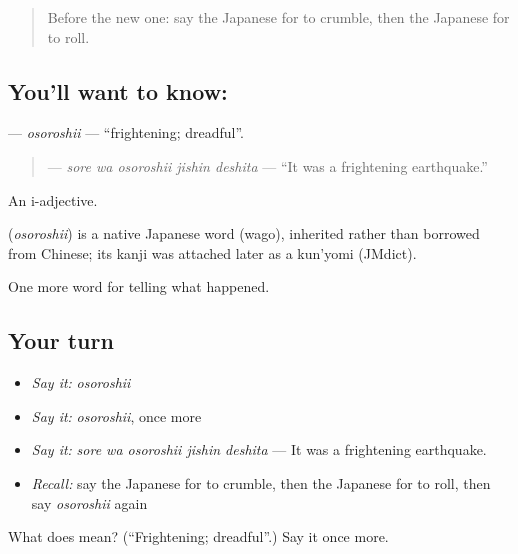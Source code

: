 \begin{quote}
Before the new one: say the Japanese for to crumble, then the Japanese for to roll.
\end{quote}

\subsection*{You'll want to know: }
\textbf{} — \emph{osoroshii} — \textquotedblleft{}frightening; dreadful\textquotedblright{}.

\begin{quote}
\textbf{  } — \emph{sore wa osoroshii jishin deshita} — \textquotedblleft{}It was a frightening earthquake.\textquotedblright{}
\end{quote}

An i-adjective.

\begin{cousinweb}
\textbf{} (\emph{osoroshii}) is a native Japanese word (wago), inherited rather than borrowed from Chinese; its kanji was attached later as a kun'yomi (JMdict).
\end{cousinweb}

\begin{grammarlens}[title={What you've built}]
One more word for telling what happened.
\end{grammarlens}

\subsection*{Your turn}
\begin{itemize}
\raggedright
  \item \emph{Say it:} \emph{osoroshii}
  \item \emph{Say it:} \emph{osoroshii}, once more
  \item \emph{Say it:} \emph{sore wa osoroshii jishin deshita} — It was a frightening earthquake.
  \item \emph{Recall:} say the Japanese for to crumble, then the Japanese for to roll, then say \emph{osoroshii} again
\end{itemize}

\begin{tcolorbox}[breakable,colback=teal!4,colframe=teal!35!black,title={Before you move on}]
What does  mean? (\textquotedblleft{}Frightening; dreadful\textquotedblright{}.) Say it once more.
\end{tcolorbox}
